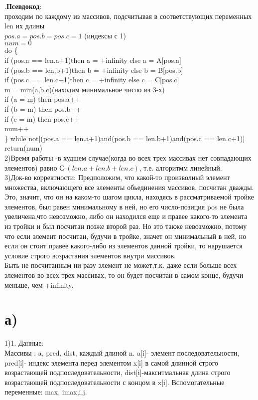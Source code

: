 \documentclass[a4paper,12pt]{article} %
\begin{document}
.\hspace{100pt}\textbf{Псевдокод}:\\

  проходим по каждому из массивов, подсчитывая в соответствующих     переменных len их длины\\
 $pos.a = pos.b = pos.c = 1$ (индексы с 1)\\
 $num = 0$\\
 do \{\\
if (pos.a == len.a+1)then a = +infinity else a = A[pos.a]\\
 if (pos.b == len.b+1)then b = +infinity else b = B[pos.b]\\
 if (pos.c == len.c+1)then c = +infinity else c = C[pos.c]\\
 m = min(a,b,c)(находим минимальное число из 3-х)\\
 if (a = m) then pos.a++\\
 if (b = m) then pos.b++\\
 if (c = m) then pos.c++\\
 num++\\
 \}
 while not[(pos.a == len.a+1)and(pos.b == len.b+1)and(pos.c == len.c+1)]\\
 return(num)\\
 
2)Время работы -в худшем случае(когда во всех трех массивах нет совпадающих элементов) равно С$\cdot (len.a+len.b+len.c)$, т.е. алгоритмм линейный.\\

3)Док-во корректности:
Предположим, что какой-то произволный элемент множества, включающего все элементы обьединения массивов, посчитан дважды. Это, значит, что он на каком-то шагом цикла, находясь в рассматриваемой тройке элементов, был равен минимальному в ней, но его число-позиция pos не была увеличена,что невозможно, либо он находился еще и правее какого-то элемента из тройки и был посчитан позже второй раз. Но это также невозможно, потому что если элемент посчитан, будучи в тройке, значет он минимальный в ней, но если он стоит правее какого-либо из элементов данной тройки, то нарушается условие строго возрастания элементов внутри массивов.\\
Быть не посчитанным ни разу элемент не может,т.к. даже если больше всех элементов во всех трех массивах, то он будет посчитан в самом конце, будучи меньше, чем +infinity.

\section{а)}
 1)1. Данные:\\
  Массивы : a, pred, dist, каждый длиной n. a[i]- элемент последовательности, pred[i]- индекс элемента перед элементом x[i] в самой длинной строго возрастающей подпоследовательности,
  dist[i]-макситмальная длина строго возрастающей подпоследовательности с концом в x[i].
  Вспомогательные переменные: max, imax,i,j.\\
  
\end{document}
